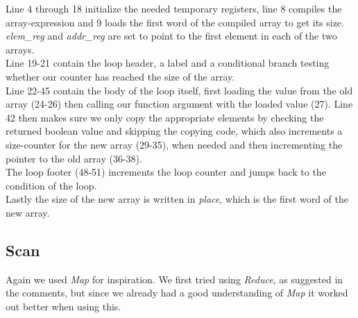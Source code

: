 \documentclass{article}
\begin{document}
Line 4 through 18 initialize the needed temporary registers, line 8 compiles the array-expression and 9 loads the first word of the compiled array to get its size. \textit{elem\_reg} and \textit{addr\_reg} are set to point to the first element in each of the two arrays.\\
Line 19-21 contain the loop header, a label and a conditional branch testing whether our counter has reached the size of the array.\\
Line 22-45 contain the body of the loop itself, first loading the value from the old array (24-26) then calling our function argument with the loaded value (27). Line 42 then makes sure we only copy the appropriate elements by checking the returned boolean value and skipping the copying code, which also increments a size-counter for the new array (29-35), when needed and then incrementing the pointer to the old array (36-38).\\
The loop footer (48-51) increments the loop counter and jumps back to the condition of the loop.\\
Lastly the size of the new array is written in \textit{place}, which is the first word of the new array. 

\subsection{Scan}
Again we used \textit{Map} for inspiration. We first tried using \textit{Reduce}, as suggested in the comments, but since we already had a good understanding of \textit{Map} it worked out better when using this.\\
\end{document}
